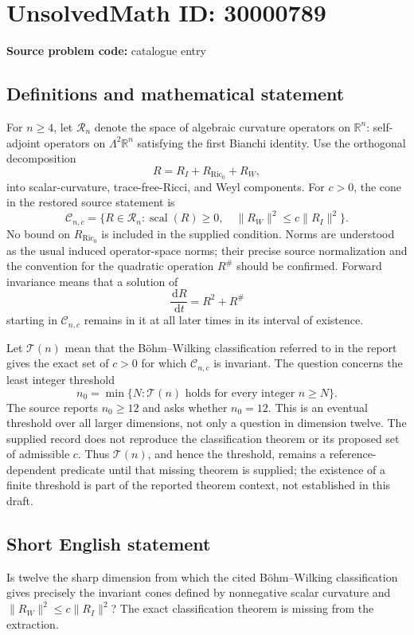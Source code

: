 \documentclass[11pt]{article}
\newcommand{\R}{\mathbb{R}}
\newcommand{\dd}{\,\mathrm{d}}
\begin{document}
\section*{UnsolvedMath ID: 30000789}
\textbf{Source problem code:} catalogue entry
\subsection{Definitions and mathematical statement}
For \(n\geq4\), let \(\mathcal R_n\) denote the space of algebraic curvature operators on \(\R^n\): self-adjoint operators on \(\Lambda^2\R^n\) satisfying the first Bianchi identity. Use the orthogonal decomposition
\[
R=R_I+R_{\operatorname{Ric}_0}+R_W,
\]
into scalar-curvature, trace-free-Ricci, and Weyl components. For \(c>0\), the cone in the restored source statement is
\[
\mathcal C_{n,c}=\{R\in\mathcal R_n:
\operatorname{scal}(R)\geq0,\quad
\|R_W\|^2\leq c\|R_I\|^2\}.
\]
No bound on \(R_{\operatorname{Ric}_0}\) is included in the supplied condition. Norms are understood as the usual induced operator-space norms; their precise source normalization and the convention for the quadratic operation \(R^\#\) should be confirmed. Forward invariance means that a solution of
\[
\frac{\dd R}{\dd t}=R^2+R^\#
\]
starting in \(\mathcal C_{n,c}\) remains in it at all later times in its interval of existence.

Let \(\mathcal T(n)\) mean that the B\"ohm--Wilking classification referred to in the report gives the exact set of \(c>0\) for which \(\mathcal C_{n,c}\) is invariant. The question concerns the least integer threshold
\[
n_0=\min\{N:\mathcal T(n)\text{ holds for every integer }n\geq N\}.
\]
The source reports \(n_0\geq12\) and asks whether \(n_0=12\). This is an eventual threshold over all larger dimensions, not only a question in dimension twelve. The supplied record does not reproduce the classification theorem or its proposed set of admissible \(c\). Thus \(\mathcal T(n)\), and hence the threshold, remains a reference-dependent predicate until that missing theorem is supplied; the existence of a finite threshold is part of the reported theorem context, not established in this draft.
\subsection{Short English statement}
Is twelve the sharp dimension from which the cited B\"ohm--Wilking classification gives precisely the invariant cones defined by nonnegative scalar curvature and \(\|R_W\|^2\leq c\|R_I\|^2\)? The exact classification theorem is missing from the extraction.
\end{document}

